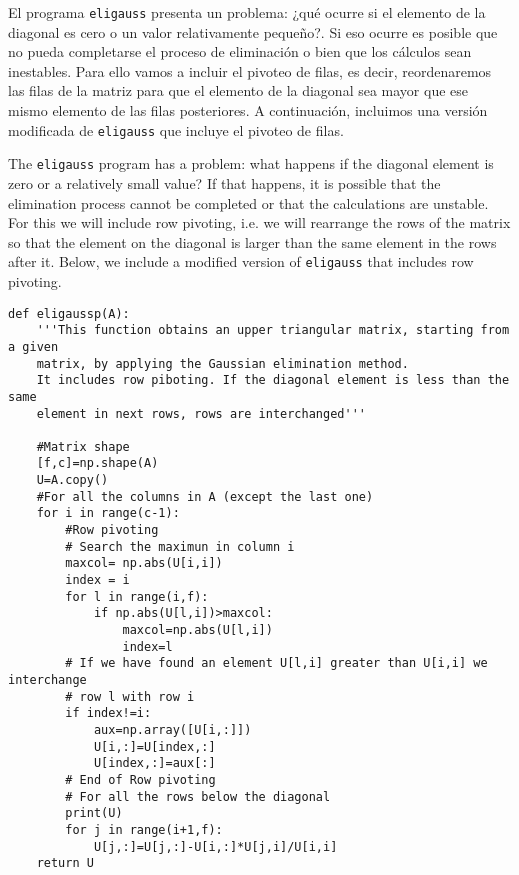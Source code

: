\begin{paracol}{2}

El programa \texttt{eligauss} presenta un problema: ¿qué ocurre si el elemento de la diagonal es cero o un valor relativamente pequeño?. Si eso ocurre es posible que no pueda completarse el proceso de eliminación o bien que los cálculos sean inestables. Para ello vamos a  incluir el pivoteo de filas, es decir, reordenaremos las filas de la matriz para que el elemento de la diagonal sea mayor que ese mismo elemento de las filas posteriores. A continuación, incluimos una versión modificada de \texttt{eligauss} que incluye el pivoteo de filas.

\switchcolumn
The \texttt{eligauss} program has a problem: what happens if the diagonal element is zero or a relatively small value? If that happens, it is possible that the elimination process cannot be completed or that the calculations are unstable. For this we will include row pivoting, i.e. we will rearrange the rows of the matrix so that the element on the diagonal is larger than the same element in the rows after it. Below, we include a modified version of \texttt{eligauss} that includes row pivoting.
\end{paracol}

\begin{verbatim}
def eligaussp(A):
    '''This function obtains an upper triangular matrix, starting from a given
    matrix, by applying the Gaussian elimination method.
    It includes row piboting. If the diagonal element is less than the same
    element in next rows, rows are interchanged'''
   
    #Matrix shape
    [f,c]=np.shape(A)
    U=A.copy()
    #For all the columns in A (except the last one)
    for i in range(c-1):
        #Row pivoting
        # Search the maximun in column i
        maxcol= np.abs(U[i,i])
        index = i
        for l in range(i,f):
            if np.abs(U[l,i])>maxcol:
                maxcol=np.abs(U[l,i])
                index=l
        # If we have found an element U[l,i] greater than U[i,i] we interchange
        # row l with row i
        if index!=i:
            aux=np.array([U[i,:]])
            U[i,:]=U[index,:]
            U[index,:]=aux[:]
        # End of Row pivoting
        # For all the rows below the diagonal
        print(U)
        for j in range(i+1,f):
            U[j,:]=U[j,:]-U[i,:]*U[j,i]/U[i,i]
    return U
    
\end{verbatim}

